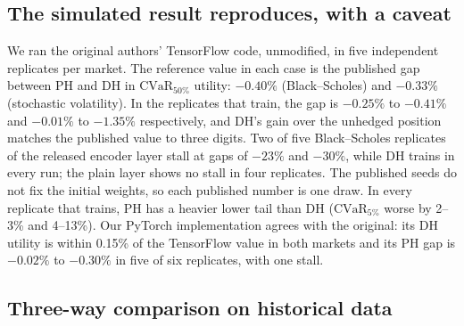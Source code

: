 \documentclass[10pt,conference]{IEEEtran}
\begin{document}
\subsection{The simulated result reproduces, with a caveat}
\label{sec:repro}
We ran the original authors' TensorFlow code, unmodified, in five independent
replicates per market. The reference value in each case is the published gap
between PH and DH in $\mathrm{CVaR}_{50\%}$ utility: $-0.40\%$
(Black--Scholes) and $-0.33\%$ (stochastic volatility). In the replicates that
train, the gap is $-0.25\%$ to $-0.41\%$ and $-0.01\%$ to $-1.35\%$
respectively, and DH's gain over the unhedged position matches the published
value to three digits. Two of five Black--Scholes replicates of the released
encoder layer stall at gaps of $-23\%$ and $-30\%$, while DH trains in every
run; the plain layer shows no stall in four replicates. The published seeds
do not fix the initial weights, so each published number is one draw. In
every replicate that trains, PH has a heavier lower tail than DH
($\mathrm{CVaR}_{5\%}$ worse by 2--3\% and 4--13\%). Our PyTorch
implementation agrees with the original: its DH utility is within 0.15\% of
the TensorFlow value in both markets and its PH gap is $-0.02\%$ to $-0.30\%$
in five of six replicates, with one stall.

\subsection{Three-way comparison on historical data}
\label{sec:main}

\begin{table}[t]
\caption{Test period 2022--2024, ten underlyings, equal-ticker means; learned
policies are averaged over five seeds. $E$: hedging error, in percent of the
initial underlying price. Learned policies are trained on the variance of $E$
and output a correction to the delta hedge.}
\label{tab:main}
\centering
\footnotesize

\end{table}

\begin{table}[t]
\caption{Pre-declared primary contrasts on the test period (percent of the
initial price). Intervals: calendar-aligned block bootstrap, 20-day blocks.
For Std $E$ a negative difference favours the first strategy; for
$\mathrm{CVaR}_{5\%}(E)$ a positive one does.}
\label{tab:contrasts}
\centering
\footnotesize
\setlength{\tabcolsep}{3.5pt}

\end{table}
\end{document}
